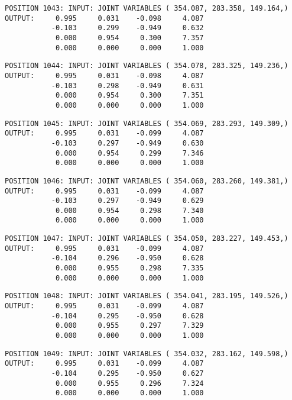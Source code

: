 \begin{verbatim}
POSITION 1043: INPUT: JOINT VARIABLES ( 354.087, 283.358, 149.164,)
OUTPUT:     0.995     0.031    -0.098     4.087
           -0.103     0.299    -0.949     0.632
            0.000     0.954     0.300     7.357
            0.000     0.000     0.000     1.000
\end{verbatim} \pagebreak[1]\begin{verbatim}
POSITION 1044: INPUT: JOINT VARIABLES ( 354.078, 283.325, 149.236,)
OUTPUT:     0.995     0.031    -0.098     4.087
           -0.103     0.298    -0.949     0.631
            0.000     0.954     0.300     7.351
            0.000     0.000     0.000     1.000
\end{verbatim} \pagebreak[1]\begin{verbatim}
POSITION 1045: INPUT: JOINT VARIABLES ( 354.069, 283.293, 149.309,)
OUTPUT:     0.995     0.031    -0.099     4.087
           -0.103     0.297    -0.949     0.630
            0.000     0.954     0.299     7.346
            0.000     0.000     0.000     1.000
\end{verbatim} \pagebreak[1]\begin{verbatim}
POSITION 1046: INPUT: JOINT VARIABLES ( 354.060, 283.260, 149.381,)
OUTPUT:     0.995     0.031    -0.099     4.087
           -0.103     0.297    -0.949     0.629
            0.000     0.954     0.298     7.340
            0.000     0.000     0.000     1.000
\end{verbatim} \pagebreak[1]\begin{verbatim}
POSITION 1047: INPUT: JOINT VARIABLES ( 354.050, 283.227, 149.453,)
OUTPUT:     0.995     0.031    -0.099     4.087
           -0.104     0.296    -0.950     0.628
            0.000     0.955     0.298     7.335
            0.000     0.000     0.000     1.000
\end{verbatim} \pagebreak[1]\begin{verbatim}
POSITION 1048: INPUT: JOINT VARIABLES ( 354.041, 283.195, 149.526,)
OUTPUT:     0.995     0.031    -0.099     4.087
           -0.104     0.295    -0.950     0.628
            0.000     0.955     0.297     7.329
            0.000     0.000     0.000     1.000
\end{verbatim} \pagebreak[1]\begin{verbatim}
POSITION 1049: INPUT: JOINT VARIABLES ( 354.032, 283.162, 149.598,)
OUTPUT:     0.995     0.031    -0.099     4.087
           -0.104     0.295    -0.950     0.627
            0.000     0.955     0.296     7.324
            0.000     0.000     0.000     1.000
\end{verbatim} \pagebreak[1]\begin{verbatim}

\end{verbatim}
